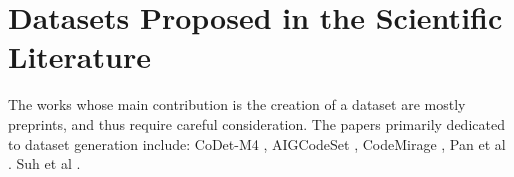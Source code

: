 \clearpage
\section{Datasets Proposed in the Scientific Literature}
The works whose main contribution is the 
creation of a dataset are mostly preprints, 
and thus require careful consideration. 
The papers primarily dedicated to dataset 
generation include: CoDet-M4 \cite{orel2025codet}, 
AIGCodeSet \cite{demirok2024aigcodeset}, 
CodeMirage \cite{guo2025codemirage},
Pan et al \cite{pan2024assessing}.
Suh et al \cite{suh2024empirical}.






\clearpage

\clearpage

\clearpage

\clearpage

